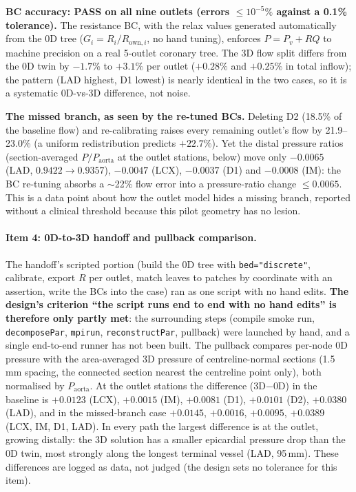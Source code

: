 \documentclass[11pt]{article}
\newcommand{\PASS}{\textcolor{passgreen}{\textbf{PASS}}}
\begin{document}
\textbf{BC accuracy: \PASS{} on all nine outlets (errors $\leq10^{-5}\%$ against a 0.1\% tolerance).} The
resistance BC, with the relax values generated automatically from the 0D tree ($G_i=R_i/R_{\text{own},i}$, no hand
tuning), enforces $P=P_v+RQ$ to machine precision on a real 5-outlet coronary tree. The 3D flow split differs from
the 0D twin by $-1.7\%$ to $+3.1\%$ per outlet ($+0.28\%$ and $+0.25\%$ in total inflow); the pattern (LAD
highest, D1 lowest) is nearly identical in the two cases, so it is a systematic 0D-vs-3D difference, not noise.

\textbf{The missed branch, as seen by the re-tuned BCs.} Deleting D2 (18.5\% of the baseline flow) and
re-calibrating raises every remaining outlet's flow by 21.9--23.0\% (a uniform redistribution predicts $+22.7\%$).
Yet the distal pressure ratios (section-averaged $P/P_\text{aorta}$ at the outlet stations, below) move only
$-0.0065$ (LAD, $0.9422\to0.9357$), $-0.0047$ (LCX), $-0.0037$ (D1) and $-0.0008$ (IM): the BC re-tuning absorbs a
$\sim$22\% flow error into a pressure-ratio change $\leq0.0065$. This is a data point about how the outlet
model hides a missing branch, reported without a clinical threshold because this pilot geometry has no lesion.

\paragraph{Item 4: 0D-to-3D handoff and pullback comparison.} The handoff's scripted portion (build the 0D tree
with \texttt{bed="discrete"}, calibrate, export $R$ per outlet, match leaves to patches by coordinate with an
assertion, write the BCs into the case) ran as one script with no hand edits. \textbf{The design's criterion
``the script runs end to end with no hand edits'' is therefore only partly met}: the surrounding steps
(compile smoke run, \texttt{decomposePar}, \texttt{mpirun}, \texttt{reconstructPar}, pullback) were launched by hand,
and a single end-to-end runner has not been built. The pullback compares per-node 0D pressure with the area-averaged
3D pressure of centreline-normal sections (1.5\,mm spacing, the connected section nearest the centreline point
only), both normalised by $P_\text{aorta}$. At the outlet stations the difference (3D$-$0D) in the baseline is
$+0.0123$ (LCX), $+0.0015$ (IM), $+0.0081$ (D1), $+0.0101$ (D2), $+0.0380$ (LAD), and in the missed-branch case
$+0.0145$, $+0.0016$, $+0.0095$, $+0.0389$ (LCX, IM, D1, LAD). In every path the largest difference is at the
outlet, growing distally: the 3D solution has a smaller epicardial pressure drop than the 0D twin, most strongly
along the longest terminal vessel (LAD, 95\,mm). These differences are logged as data, not judged (the design sets
no tolerance for this item).
\end{document}
